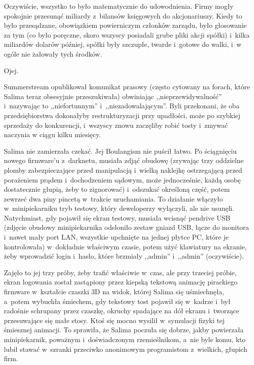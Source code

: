 \documentclass[oneside,polish,11pt,sfheadings]{mwbk}
\begin{document}
Oczywiście, wszystko to było matematycznie do udowodnienia. Firmy mogły
spokojnie przesunąć miliardy z~bilansów księgowych do akcjonariuszy.
Kiedy to było przesądzane, obowiązkiem powierniczym członków zarządu,
było głosowanie za tym (co było poręczne, skoro wszyscy posiadali grube
pliki akcji spółki) i~kilka miliardów dolarów później, spółki były
szczupłe, twarde i~gotowe do walki, i~w ogóle nie żałowały tych środków.

Ojej.

Summerstream opublikował komunikat prasowy (często cytowany na forach,
które Salima teraz obsesyjnie przeszukiwała) obwiniając
,,nieprzewidywalność'' i~nazywając to ,,niefortunnym'' i~,,niezadowalającym''. Byli przekonani, że oba przedsiębiorstwa
dokonałyby restrukturyzacji przy upadłości, może po szybkiej sprzedaży
do konkurencji, i~wszyscy znowu zaczęliby robić tosty i~zmywać naczynia
w ciągu kilku miesięcy.

Salima nie zamierzała czekać. Jej Boulangism nie puścił łatwo. Po
ściągnięciu nowego firmware'u z~darknetu, musiała zdjąć obudowę
(zrywając trzy oddzielne plomby zabezpieczające przed manipulacją i~wielką naklejkę ostrzegającą przed porażeniem prądem i~dochodzeniem
sądowym, może jednocześnie, każdą osobę dostatecznie głupią, żeby to
zignorować) i~odszukać określoną część, potem zewrzeć dwa piny pincetą w~trakcie uruchamiania. To działanie włączyło w~minipiekarniku tryb
testowy, który deweloperzy wyłączyli, ale nie usunęli. Natychmiast, gdy
pojawił się ekran testowy, musiała wcisnąć pendrive USB (zdjęcie obudowy
minipiekarnika odsłoniło zestaw gniazd USB, łącze do monitora i~nawet
mały port LAN, wszystkie upchnięte na jednej płytce PC, które je
kontrolowała) w~dokładnie właściwym czasie, potem użyć klawiatury na
ekranie, żeby wprowadzić login i~hasło, które brzmiały ,,admin'' i~,,admin'' (oczywiście).

Zajęło to jej trzy próby, żeby trafić właściwie w~czas, ale przy
trzeciej próbie, ekran logowania został zastąpiony przez kiepską
tekstową animację pirackiego firmware w~kształcie czaszki 3D na widok,
której Salima się uśmiechnęła, a~potem wybuchła śmiechem, gdy tekstowy
tost pojawił się w~kadrze i~był radośnie schrupany przez czaszkę,
okruchy spadające na dół ekranu i~tworzące przesuwające się małe stosy.
Ktoś się mocno wysilił w~symulacji fizyki tej śmiesznej animacji. To
sprawiła, że Salima poczuła się dobrze, jakby powierzała minipiekarnik,
poważnym i~doświadczonym rzemieślnikom, a~nie byle komu, kto lubił
stawać w~szranki przeciwko anonimowym programistom z~wielkich, głupich
firm.
\end{document}
